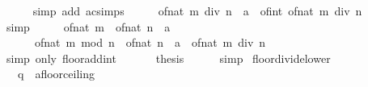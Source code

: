 \begin{isabellebody}
\ \ \ \ \isamarkupfalse%
\ {\isacharparenleft}{\kern0pt}simp\ add{\isacharcolon}{\kern0pt}\ ac{\isacharunderscore}{\kern0pt}simps{\isacharparenright}{\kern0pt}\isanewline
\ \ \isamarkupfalse%
\ \isamarkupfalse%
\ {\isachardoublequoteopen}{\isacharparenleft}{\kern0pt}of{\isacharunderscore}{\kern0pt}nat\ {\isacharparenleft}{\kern0pt}m\ div\ n{\isacharparenright}{\kern0pt}\ {\isacharcolon}{\kern0pt}{\isacharcolon}{\kern0pt}\ {\isacharprime}{\kern0pt}a{\isacharparenright}{\kern0pt}\ {\isacharequal}{\kern0pt}\ of{\isacharunderscore}{\kern0pt}int\ {\isacharparenleft}{\kern0pt}of{\isacharunderscore}{\kern0pt}nat\ {\isacharparenleft}{\kern0pt}m\ div\ n{\isacharparenright}{\kern0pt}{\isacharparenright}{\kern0pt}{\isachardoublequoteclose}\isanewline
\ \ \ \ \isamarkupfalse%
\ simp\isanewline
\ \ \isamarkupfalse%
\ \isamarkupfalse%
\ {\isachardoublequoteopen}{\isasymlfloor}of{\isacharunderscore}{\kern0pt}nat\ m\ {\isacharslash}{\kern0pt}\ of{\isacharunderscore}{\kern0pt}nat\ n\ {\isacharcolon}{\kern0pt}{\isacharcolon}{\kern0pt}\ {\isacharprime}{\kern0pt}a{\isasymrfloor}\ {\isacharequal}{\kern0pt}\isanewline
\ \ \ \ \ \ {\isasymlfloor}of{\isacharunderscore}{\kern0pt}nat\ {\isacharparenleft}{\kern0pt}m\ mod\ n{\isacharparenright}{\kern0pt}\ {\isacharslash}{\kern0pt}\ of{\isacharunderscore}{\kern0pt}nat\ n\ {\isacharcolon}{\kern0pt}{\isacharcolon}{\kern0pt}\ {\isacharprime}{\kern0pt}a{\isasymrfloor}\ {\isacharplus}{\kern0pt}\ of{\isacharunderscore}{\kern0pt}nat\ {\isacharparenleft}{\kern0pt}m\ div\ n{\isacharparenright}{\kern0pt}{\isachardoublequoteclose}\isanewline
\ \ \ \ \isamarkupfalse%
\ {\isacharparenleft}{\kern0pt}simp\ only{\isacharcolon}{\kern0pt}\ floor{\isacharunderscore}{\kern0pt}add{\isacharunderscore}{\kern0pt}int{\isacharparenright}{\kern0pt}\isanewline
\ \ \isamarkupfalse%
\ {\isacharasterisk}{\kern0pt}\ \isamarkupfalse%
\ {\isacharquery}{\kern0pt}thesis\isanewline
\ \ \ \ \isamarkupfalse%
\ simp\isanewline
{}\isamarkupfalse%
%
\endisatagproof
{\isafoldproof}%
%
\isadelimproof
\isanewline
%
\endisadelimproof
\isanewline
{}\isamarkupfalse%
\ floor{\isacharunderscore}{\kern0pt}divide{\isacharunderscore}{\kern0pt}lower{\isacharcolon}{\kern0pt}\isanewline
\ \ \ q\ {\isacharcolon}{\kern0pt}{\isacharcolon}{\kern0pt}\ {\isachardoublequoteopen}{\isacharprime}{\kern0pt}a{\isacharcolon}{\kern0pt}{\isacharcolon}{\kern0pt}floor{\isacharunderscore}{\kern0pt}ceiling{\isachardoublequoteclose}\isanewline

\end{isabellebody}
